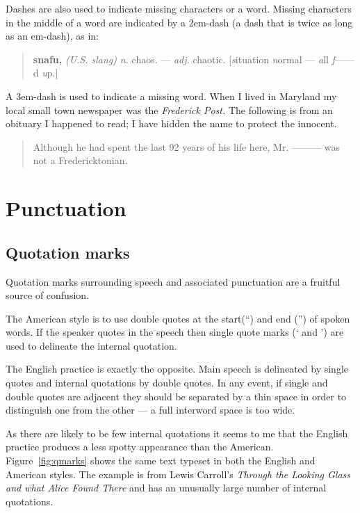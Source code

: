 \documentclass[10pt,letterpaper]{memoir}
\begin{document}
   Dashes are also used to indicate missing characters or a word. Missing
characters in the middle of a word are indicated by a 2em-dash (a dash that
is twice as long as an em-dash), as in:
\begin{quote}
\textbf{snafu,} \textit{(U.S. slang)} \textit{n.} chaos. --- \textit{adj.}
  chaotic. [\textit{s}ituation \textit{n}ormal --- \textit{a}ll
  \textit{f}------d \textit{u}p.]
\end{quote}
A 3em-dash is used to indicate a missing word. When I lived in Maryland my
local small town newspaper was the \textit{Frederick Post.} 
The following is from an 
obituary I happened to read; I have hidden the name to protect the 
innocent.
\begin{quote}
  Although he had spent the last 92 years of his life here, 
Mr. --------- was not a Fredericktonian.
\end{quote}


\section{Punctuation}

\subsection{Quotation marks}

    Quotation marks surrounding speech and associated punctuation 
are a fruitful source of confusion.

    The American style is to use double quotes at the start(``) and 
end ('') of spoken words. If the speaker quotes in the speech then single
quote marks (` and ') are used to delineate the internal quotation.

    The English practice is exactly the opposite. Main speech is delineated
by single quotes and internal quotations by double quotes. In any event,
if single and double quotes are adjacent they should be separated by a thin
space in order to distinguish one from the other --- a full interword space
is too wide.

    As there are likely to be few internal quotations it seems to me that
the English practice produces a less spotty appearance than the American.
Figure~\ref{fig:qmarks} shows the same text typeset in both the English
and American styles. The example is from Lewis Carroll's 
\emph{Through the Looking Glass and what Alice Found There} 
and has an unusually large number of internal quotations. 
\end{document}
